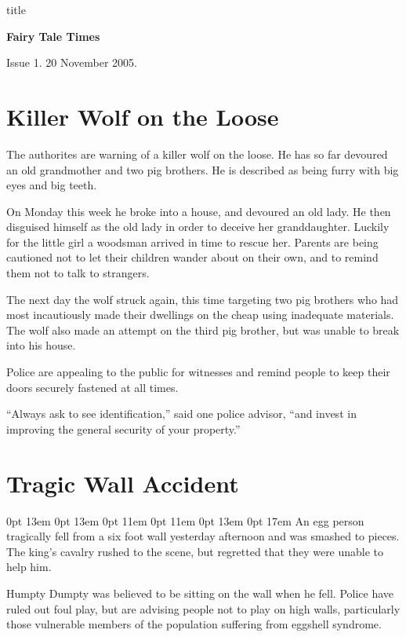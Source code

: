 \documentclass{article}
\begin{document}
\begin{staticcontents*}{title}
\begin{center}
\bfseries\Huge
Fairy Tale Times
\end{center}
\hfill Issue 1. 20 November 2005.
\end{staticcontents*}

\section{Killer Wolf on the Loose}

The authorites are warning of a killer wolf on the
loose. He has so far devoured an old grandmother and
two pig brothers. He is described as being furry with
big eyes and big teeth.

On Monday this week he broke into a house, and devoured
an old lady. He then disguised himself as the old lady
in order to deceive her granddaughter. Luckily for the little
girl a woodsman arrived in time to rescue her. Parents are
being cautioned not to let their children wander about on
their own, and to remind them not to talk to strangers.\par
\framebreak

The next day the wolf struck again, this time targeting two
pig brothers who had most incautiously made their dwellings
on the cheap using inadequate materials. The wolf also made
an attempt on the third pig brother, but was unable to break
into his house.

Police are appealing to the public for witnesses and remind
people to keep their doors securely fastened at all times.

``Always ask to see identification,'' said one police advisor,
``and invest in improving the general security of your property.''

\framebreak
\section{Tragic Wall Accident}

{ 0pt 13em 0pt 13em 0pt 11em 0pt 11em 0pt 13em
0pt 17em
An egg person tragically fell from a six foot wall yesterday
afternoon and was smash\-ed to pieces. The king's cavalry rushed
to the scene, but regretted that they  were unable to help him.
\par}

Humpty Dumpty was believed to be sitting
on the wall when he fell. Police have ruled out foul play, but
are advising people not to play on high walls, particularly
those vulnerable members of the population suffering from
eggshell syndrome.
\end{document}
